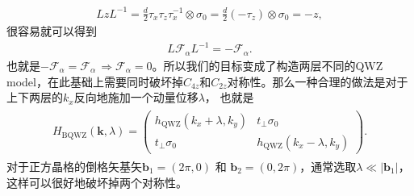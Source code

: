 \documentclass[10pt, oneside]{article}
\begin{document}
\begin{align}
	L z L^{-1 } = \frac{d }{2 } \tau_{x } \tau_{z } \tau_{x }^{-1 } \otimes \sigma_{0} = \frac{d }{ 2 } \left(- \tau_{z } \right) \otimes \sigma_{0} = -z,
\end{align}
很容易就可以得到
\begin{align}
	L \mathcal{F}_{\alpha} L^{-1} = - \mathcal{F}_{\alpha}.
\end{align}
也就是\(-\mathcal{F}_{\alpha} = \mathcal{F}_{\alpha} \, \Rightarrow \mathcal{F}_{\alpha} = 0\)。所以我们的目标变成了构造两层不同的QWZ model，在此基础上需要同时破坏掉\(C_{4z}\)和\(C_{2z}\)对称性。那么一种合理的做法是对于上下两层的\(k_{x}\)反向地施加一个动量位移\(\lambda\)， 也就是
\begin{align}
	\boxed{
		\begin{aligned}
			H_\mathrm{BQWZ} \left(\bm{k}, \lambda\right) = \begin{pmatrix}
				h_{\mathrm{QWZ}}\left(k_{x}+\lambda, k_{y}\right) & t_{\perp} \sigma_{0} \\
				t_{\perp} \sigma_{0 } & h_{\mathrm{QWZ}} \left(k_{x} - \lambda , k_{y}\right)
			\end{pmatrix}.
		\end{aligned}
	}
\end{align}
对于正方晶格的倒格矢基矢\(\bm{b}_{1} = \left(2 \pi, 0\right)\) 和 \(\bm{b }_{2} = \left(0, 2 \pi\right)\)，通常选取\(\lambda \ll \left|\bm{b}_{1}\right|\)，这样可以很好地破坏掉两个对称性。
\end{document}
